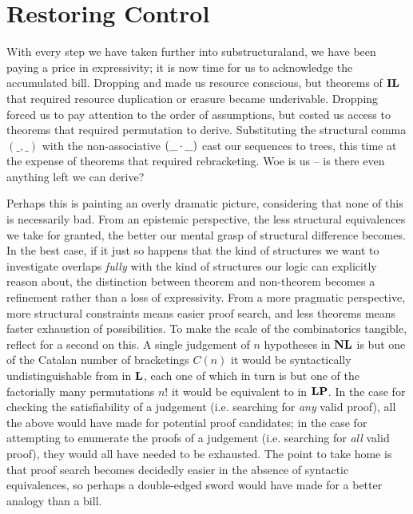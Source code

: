\section{Restoring Control}\label{section:modalities}
With every step we have taken further into substructuraland, we have been paying a price in expressivity; it is now time for us to acknowledge the accumulated bill.
Dropping \Contraction{} and \Weakening{} made us resource conscious, but theorems of $\textbf{IL}$ that required resource duplication or erasure became underivable.
Dropping \Exchange{} forced us to pay attention to the order of assumptions, but costed us access to theorems that required permutation to derive.
Substituting the structural comma $(\_,\_)$ with the non-associative $(\_\mkern-0.5mu\cdot\mkern-0.5mu \_)$ cast our sequences to trees, this time at the expense of theorems that required rebracketing.
Woe is us -- is there even anything left we can derive?

Perhaps this is painting an overly dramatic picture, considering that none of this is necessarily bad.
From an epistemic perspective, the less structural equivalences we take for granted, the better our mental grasp of structural difference becomes.
In the best case, if it just so happens that the kind of structures we want to investigate overlaps \textit{fully} with the kind of structures our logic can explicitly reason about, the distinction between theorem and non-theorem becomes a refinement rather than a loss of expressivity.
From a more pragmatic perspective, more structural constraints means easier proof search, and less theorems means faster exhaustion of possibilities.
To make the scale of the combinatorics tangible, reflect for a second on this.
A single judgement of $n$ hypotheses in $\textbf{NL}$ is but one of the Catalan number of bracketings $C(n)$ it would be syntactically undistinguishable from in $\textbf{L}$, each one of which in turn is but one of the factorially many permutations $n!$ it would be equivalent to in $\textbf{LP}$.
In the case for checking the satisfiability of a judgement (i.e. searching for \textit{any} valid proof), all the above would have made for potential proof candidates;
in the case for attempting to enumerate the proofs of a judgement (i.e. searching for \textit{all} valid proof), they would all have needed to be exhausted.
The point to take home is that proof search becomes decidedly easier in the absence of syntactic equivalences, so perhaps a double-edged sword would have made for a better analogy than a bill.

